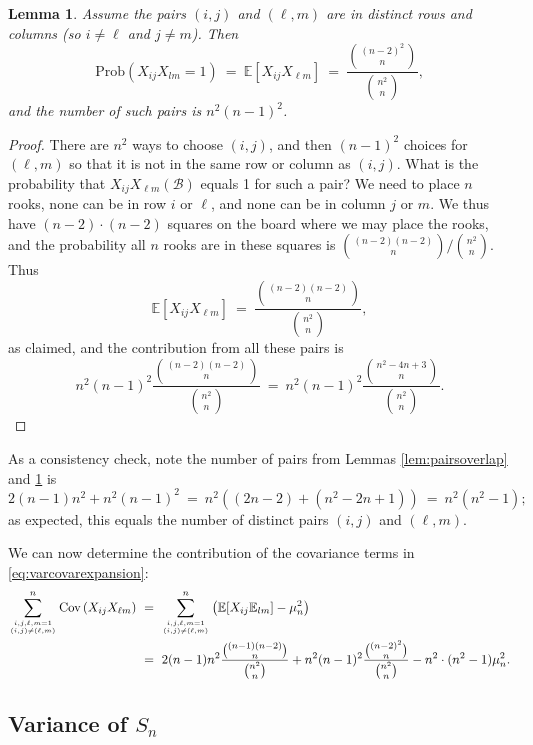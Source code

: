 \documentclass[12pt,reqno]{amsart}
\newcommand{\E}{\mathbb{E}}
\renewcommand{\E}{\mathbb{E}}
\numberwithin{equation}{section}
\newtheorem{lem}[thm]{Lemma}
\theoremstyle{plain}
\newcommand\be{\begin{equation}}
\newcommand\ee{\end{equation}}
\newcommand{\ncr}[2]{{#1 \choose #2}}
\begin{document}
\begin{lem}\label{lem:pairsnooverlap} Assume the pairs $(i,j)$ and $(\ell, m)$ are in distinct rows and columns (so $i \neq \ell$ and $j \neq m$). Then \be
    \text{Prob}\left(X_{ij}X_{lm} = 1\right)\ =\ \E[X_{ij}X_{\ell m}]\ =\ \frac{\ncr{(n-2)^2}{n}}{\ncr{n^2}{n}},
 \ee and the number of such pairs is $n^2 (n-1)^2$. \end{lem}

\begin{proof} There are $n^2$ ways to choose $(i,j)$, and then $(n - 1)^2$ choices for $(\ell, m)$ so that it is not in the same row or column as $(i,j)$. What is the probability that $X_{ij} X_{\ell m}(\mathcal{B})$ equals 1 for such a pair? We need to place $n$ rooks, none can be in row $i$ or $\ell$, and none can be in column $j$ or $m$. We thus have $(n-2) \cdot (n-2)$ squares on the board where we may place the rooks, and the probability all $n$ rooks are in these squares is $\ncr{(n-2)(n-2)}{n} / \ncr{n^2}{n}$. Thus \be \E[X_{ij} X_{\ell m}] \ = \ \frac{\ncr{(n-2)(n-2)}{n}}{\ncr{n^2}{n}}, \ee as claimed, and the contribution from all these pairs is \be n^2(n-1)^2 \frac{\ncr{(n-2)(n-2)}{n}}{\ncr{n^2}{n}} \ = \ n^2(n-1)^2 \frac{\ncr{n^2-4n+3}{n}}{\ncr{n^2}{n}}. \ee
\end{proof}

As a consistency check, note the number of pairs from Lemmas \ref{lem:pairsoverlap} and \ref{lem:pairsnooverlap} is \be 2(n-1)n^2 + n^2 (n-1)^2 \ = \ n^2\left((2n-2) + (n^2 - 2n + 1)\right) \ = \ n^2 (n^2 - 1); \ee as expected, this equals the number of distinct pairs $(i,j)$ and $(\ell, m)$.

We can now determine the contribution of the covariance terms in \eqref{eq:varcovarexpansion}:
\begin{align}
    \sum_{i,j, \ell, m = 1 \atop (i,j) \neq (\ell,m)}^n \text{Cov}\left(X_{ij}X_{\ell m}\right) &\ = \   \sum_{i,j, \ell, m = 1 \atop (i,j) \neq (\ell,m)}^n \left(\E[X_{ij}\E_{lm}] - \mu_n^2\right) \nonumber\\
    &\ = \  2(n-1)n^2 \frac{\ncr{(n-1)(n-2)}{n}}{\ncr{n^2}{n}} + n^2(n-1)^2\frac{\ncr{(n-2)^2}{n}}{\ncr{n^2}{n}} - n^2  \cdot  (n^2 - 1)\mu_n^2.
\end{align}


\subsection{Variance of $S_n$}
\end{document}
